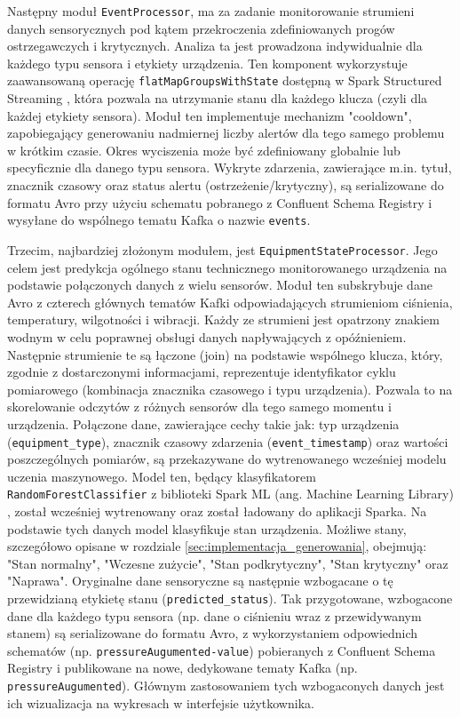 Następny moduł \texttt{EventProcessor}, ma za zadanie monitorowanie strumieni danych sensorycznych pod kątem przekroczenia zdefiniowanych progów ostrzegawczych i krytycznych. Analiza ta jest prowadzona indywidualnie dla każdego typu sensora i etykiety urządzenia. Ten komponent wykorzystuje zaawansowaną operację \texttt{flatMapGroupsWithState} dostępną w Spark Structured Streaming \cite{spark_streaming} , która pozwala na utrzymanie stanu dla każdego klucza (czyli dla każdej etykiety sensora). Moduł ten implementuje mechanizm "cooldown", zapobiegający generowaniu nadmiernej liczby alertów dla tego samego problemu w krótkim czasie. Okres wyciszenia może być zdefiniowany globalnie lub specyficznie dla danego typu sensora. Wykryte zdarzenia, zawierające m.in. tytuł, znacznik czasowy oraz status alertu (ostrzeżenie/krytyczny), są serializowane do formatu Avro przy użyciu schematu pobranego z Confluent Schema Registry \cite{confluent_schema_registry} i wysyłane do wspólnego tematu Kafka o nazwie \texttt{events}.

Trzecim, najbardziej złożonym modułem, jest \texttt{EquipmentStateProcessor}. Jego celem jest predykcja ogólnego stanu technicznego monitorowanego urządzenia na podstawie połączonych danych z wielu sensorów. Moduł ten subskrybuje dane Avro \cite{avro_documentation} z czterech głównych tematów Kafki odpowiadających strumieniom ciśnienia, temperatury, wilgotności i wibracji. Każdy ze strumieni jest opatrzony znakiem wodnym w celu poprawnej obsługi danych napływających z opóźnieniem. Następnie strumienie te są łączone (join) na podstawie wspólnego klucza, który, zgodnie z dostarczonymi informacjami, reprezentuje identyfikator cyklu pomiarowego (kombinacja znacznika czasowego i typu urządzenia). Pozwala to na skorelowanie odczytów z różnych sensorów dla tego samego momentu i urządzenia. Połączone dane, zawierające cechy takie jak: typ urządzenia (\texttt{equipment\_type}), znacznik czasowy zdarzenia (\texttt{event\_timestamp}) oraz wartości poszczególnych pomiarów, są przekazywane do wytrenowanego wcześniej modelu uczenia maszynowego. Model ten, będący klasyfikatorem \texttt{RandomForestClassifier} z biblioteki Spark ML (ang. Machine Learning Library) \cite{spark_mllib_reference}, został wcześniej wytrenowany oraz został ładowany do aplikacji Sparka. Na podstawie tych danych model klasyfikuje stan urządzenia. Możliwe stany, szczegółowo opisane w rozdziale \ref{sec:implementacja_generowania}, obejmują: "Stan normalny", "Wczesne zużycie", "Stan podkrytyczny", "Stan krytyczny" oraz "Naprawa". Oryginalne dane sensoryczne są następnie wzbogacane o tę przewidzianą etykietę stanu (\texttt{predicted\_status}). Tak przygotowane, wzbogacone dane dla każdego typu sensora (np. dane o ciśnieniu wraz z przewidywanym stanem) są serializowane do formatu Avro, z wykorzystaniem odpowiednich schematów (np. \texttt{pressureAugumented-value}) pobieranych z Confluent Schema Registry \cite{confluent_schema_registry} i publikowane na nowe, dedykowane tematy Kafka (np. \texttt{pressureAugumented}). Głównym zastosowaniem tych wzbogaconych danych jest ich wizualizacja na wykresach w interfejsie użytkownika.

